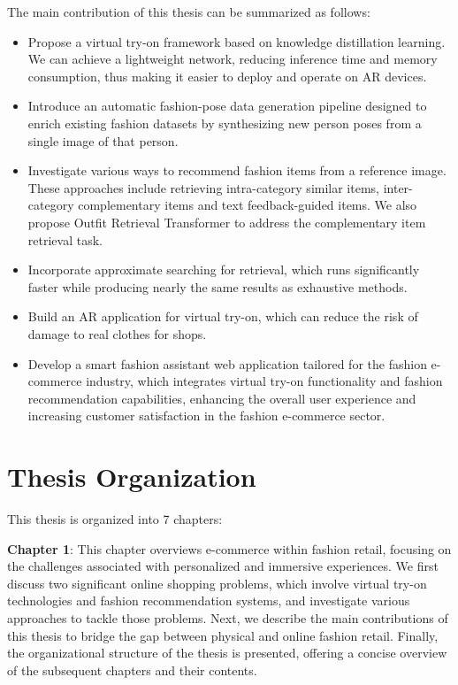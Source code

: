 The main contribution of this thesis can be summarized as follows:
\begin{itemize}
    \item Propose a virtual try-on framework based on knowledge distillation learning. We can achieve a lightweight network, reducing inference time and memory consumption, thus making it easier to deploy and operate on AR devices.
    \item Introduce an automatic fashion-pose data generation pipeline designed to enrich existing fashion datasets by synthesizing new person poses from a single image of that person.
    \item Investigate various ways to recommend fashion items from a reference image. These approaches include retrieving intra-category similar items, inter-category complementary items and text feedback-guided items. We also propose Outfit Retrieval Transformer to address the complementary item retrieval task.
    \item Incorporate approximate searching for retrieval, which runs significantly faster while producing nearly the same results as exhaustive methods.
    \item Build an AR application for virtual try-on, which can reduce the risk of damage to real clothes for shops.
    \item Develop a smart fashion assistant web application tailored for the fashion e-commerce industry, which integrates virtual try-on functionality and fashion recommendation capabilities, enhancing the overall user experience and increasing customer satisfaction in the fashion e-commerce sector. 
\end{itemize}




\section{Thesis Organization}

This thesis is organized into 7 chapters: 

\textbf{Chapter 1}: This chapter overviews e-commerce within fashion retail, focusing on the challenges associated with personalized and immersive experiences. We first discuss two significant online shopping problems, which involve virtual try-on technologies and fashion recommendation systems, and investigate various approaches to tackle those problems. Next, we describe the main contributions of this thesis to bridge the gap between physical and online fashion retail. Finally, the organizational structure of the thesis is presented, offering a concise overview of the subsequent chapters and their contents.

